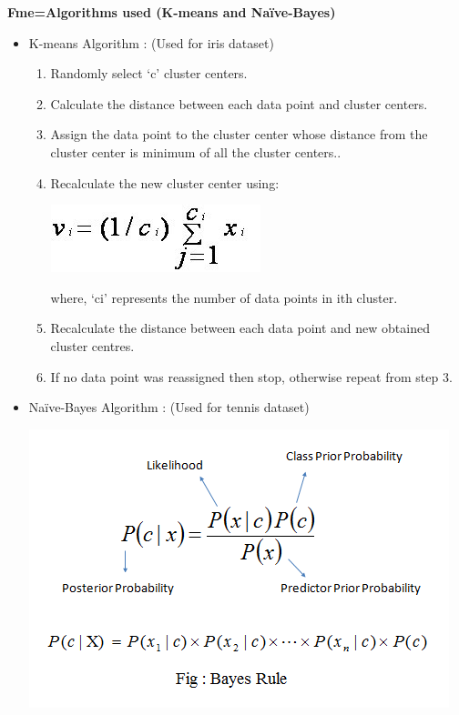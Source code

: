 \documentclass[a4paper,12pt]{article}
\begin{document}
	{\rmfamily
		\textbf{Fme=Algorithms used (K-means and Naïve-Bayes)}
		
		
			\begin{itemize}
				\item K-means Algorithm : (Used for iris dataset)
				
				\begin{enumerate}
					\item Randomly select ‘c’ cluster centers.
					\item Calculate the distance between each data point and cluster centers.
					\item  Assign the data point to the cluster center whose distance from the cluster center is minimum of all the cluster centers..
					\item  Recalculate the new cluster center using:  
					\begin{center}
						\includegraphics[scale=0.5]{equation.jpg}
					\end{center}
					where, ‘ci’ represents the number of data points in ith cluster.
					\item Recalculate the distance between each data point and new obtained cluster centres.
					\item If no data point was reassigned then stop, otherwise repeat from step 3.
					
				\end{enumerate}
				
				\item Naïve-Bayes Algorithm : (Used for tennis dataset)
				
				\includegraphics[scale=0.5]{nb.png}
			\end{itemize}
			
}
\end{document}
